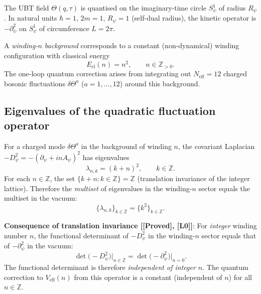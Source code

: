 \documentclass[12pt,a4paper]{article}
\theoremstyle{definition}
\theoremstyle{remark}
\newcommand{\ZZ}{\mathbb{Z}}
\newcommand{\PROVED}{\textbf{[Proved]}}
\newcommand{\Lzero}{\textbf{[L0]}}
\begin{document}
The UBT field $\Theta(q,\tau)$ is quantised on the imaginary-time circle
$S^1_\psi$ of radius $R_\psi$.  In natural units $\hbar = 1$, $2m = 1$,
$R_\psi = 1$ (self-dual radius), the kinetic operator is $-\partial^2_\psi$
on $S^1_\psi$ of circumference $L = 2\pi$.

A \emph{winding-$n$ background} corresponds to a constant (non-dynamical)
winding configuration with classical energy
\begin{equation}
  E_{\mathrm{cl}}(n) = n^2, \qquad n \in \ZZ_{> 0}.
  \label{eq:cw:Ecl}
\end{equation}
The one-loop quantum correction arises from integrating out $N_{\mathrm{eff}} = 12$
charged bosonic fluctuations $\delta\Theta^a$ ($a = 1,\ldots,12$) around this
background.

\subsection{Eigenvalues of the quadratic fluctuation operator}
\label{sec:cw:eigs}

For a charged mode $\delta\Theta^a$ in the background of winding $n$, the
covariant Laplacian $-D^2_\psi = -(\partial_\psi + inA_\psi)^2$ has eigenvalues
\begin{equation}
  \lambda_{n,k} = (k + n)^2, \qquad k \in \ZZ.
  \label{eq:cw:eigs}
\end{equation}
For each $n \in \ZZ$, the set $\{k+n : k \in \ZZ\} = \ZZ$ (translation
invariance of the integer lattice).  Therefore the \emph{multiset} of
eigenvalues in the winding-$n$ sector equals the multiset in the vacuum:
\begin{equation}
  \{\lambda_{n,k}\}_{k\in\ZZ} = \{k^2\}_{k\in\ZZ}.
  \label{eq:cw:transl}
\end{equation}

\begin{resultbox}
\textbf{Consequence of translation invariance [\PROVED, \Lzero]}: For
\emph{integer} winding number $n$, the functional determinant of
$-D^2_\psi$ in the winding-$n$ sector equals that of $-\partial^2_\psi$
in the vacuum:
\begin{equation}
  \det\bigl(-D^2_\psi\bigr)\big|_{n \in \ZZ}
  = \det\bigl(-\partial^2_\psi\bigr)\big|_{n=0}.
  \label{eq:cw:detconst}
\end{equation}
The functional determinant is therefore \emph{independent of integer $n$}.
The quantum correction to $V_{\mathrm{eff}}(n)$ from this operator
is a constant (independent of $n$) for all $n \in \ZZ$.
\end{resultbox}
\end{document}
